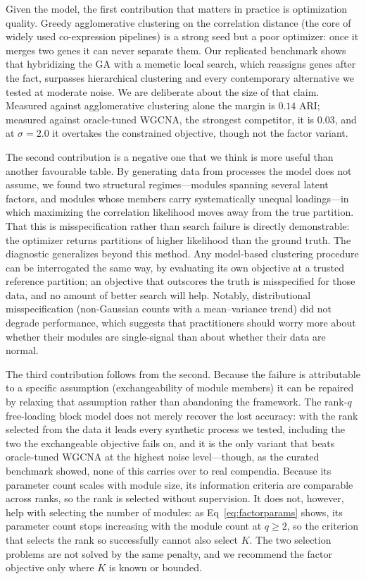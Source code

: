 Given the model, the first contribution that matters in practice is optimization
quality. Greedy agglomerative clustering on the correlation distance (the core
of widely used co-expression pipelines) is a strong seed but a poor optimizer:
once it merges two genes it can never separate them. Our replicated benchmark
shows that hybridizing the GA with a memetic local search, which reassigns genes
after the fact, surpasses hierarchical clustering and every contemporary
alternative we tested at moderate noise. We are deliberate about the size of that
claim. Measured against agglomerative clustering alone the margin is $0.14$ ARI;
measured against oracle-tuned WGCNA, the strongest competitor, it is $0.03$, and
at $\sigma=2.0$ it overtakes the constrained objective, though not the factor variant.

The second contribution is a negative one that we think is more useful than
another favourable table. By generating data from processes the model does not
assume, we found two structural regimes---modules spanning several latent factors,
and modules whose members carry systematically unequal loadings---in which
maximizing the correlation likelihood moves away from the true partition. That
this is misspecification rather than search failure is directly demonstrable: the
optimizer returns partitions of higher likelihood than the ground truth. The
diagnostic generalizes beyond this method. Any model-based clustering procedure
can be interrogated the same way, by evaluating its own objective at a trusted
reference partition; an objective that outscores the truth is misspecified for
those data, and no amount of better search will help. Notably, distributional
misspecification (non-Gaussian counts with a mean--variance trend) did not
degrade performance, which suggests that practitioners should worry more about
whether their modules are single-signal than about whether their data are normal.

The third contribution follows from the second. Because the failure is
attributable to a specific assumption (exchangeability of module members) it
can be repaired by relaxing that assumption rather than abandoning the framework.
The rank-$q$ free-loading block model does not merely recover the lost accuracy:
with the rank selected from the data it leads every synthetic process we tested, including the two the exchangeable objective fails on, and it is the only variant that beats oracle-tuned WGCNA at the highest noise level---though, as the curated benchmark showed, none of this carries over to real compendia. Because its parameter count
scales with module size, its information criteria are comparable across ranks, so
the rank is selected without supervision. It does not, however, help with
selecting the number of modules: as Eq~\eqref{eq:factorparams} shows, its
parameter count stops increasing with the module count at $q\ge2$, so the
criterion that selects the rank so successfully cannot also select $K$. The two
selection problems are not solved by the same penalty, and we recommend the
factor objective only where $K$ is known or bounded.

